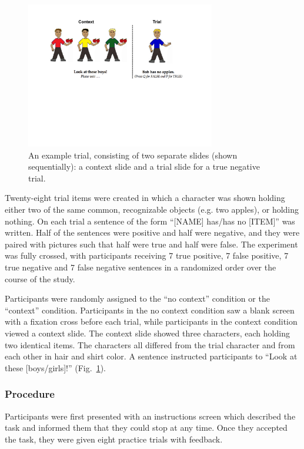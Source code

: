 \documentclass[10pt,letterpaper]{article}
\begin{document}
\begin{figure}[t]
\begin{center} 
\includegraphics[width=3.25in]{figures/negatron_trialfig2.pdf}
\caption{\label{fig:trial} An example trial, consisting of two separate slides (shown sequentially): a context slide and a trial slide for a true negative trial. }
\vspace{-5mm}
\end{center} 
\end{figure}

Twenty-eight trial items were created in which a character was shown holding either two of the same common, recognizable objects (e.g. two apples), or holding nothing.  On each trial a sentence of the form ``[NAME] has/has no [ITEM]'' was written.  Half of the sentences were positive and half were negative, and they were paired with pictures such that half were true and half were false.  The experiment was fully crossed, with participants receiving 7 true positive, 7 false positive, 7 true negative and 7 false negative sentences in a randomized order over the course of the study.  

Participants were randomly assigned to the ``no context'' condition or the ``context'' condition.  Participants in the no context condition saw a blank screen with a fixation cross before each trial, while participants in the context condition viewed a context slide.  The context slide showed three characters, each holding two identical items.  The characters all differed from the trial character and from each other in hair and shirt color.  A sentence instructed participants to ``Look at these [boys/girls]!'' (Fig.\ \ref{fig:trial}).  


\subsubsection{Procedure}
Participants were first presented with an instructions screen which described the task and informed them that they could stop at any time.  Once they accepted the task, they were given eight practice trials with feedback. 
\end{document}
